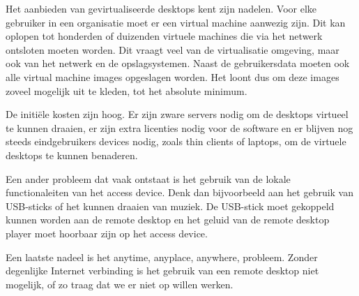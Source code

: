 Het aanbieden van gevirtualiseerde desktops kent zijn nadelen. Voor elke gebruiker in een organisatie moet er een virtual machine aanwezig zijn. Dit kan oplopen tot honderden of duizenden virtuele machines die via het netwerk ontsloten moeten worden. Dit vraagt veel van de virtualisatie omgeving, maar ook van het netwerk en de opslagsystemen. Naast de gebruikersdata moeten ook alle virtual machine images opgeslagen worden. Het loont dus om deze images zoveel mogelijk uit te kleden, tot het absolute minimum.

De initi\"ele kosten zijn hoog. Er zijn zware servers nodig om de desktops virtueel te kunnen draaien, er zijn extra licenties nodig voor de software en er blijven nog steeds eindgebruikers devices nodig, zoals thin clients of laptops, om de virtuele desktops te kunnen benaderen.

Een ander probleem dat vaak ontstaat is het gebruik van de lokale functionaleiten van het access device. Denk dan bijvoorbeeld aan het gebruik van USB-sticks of het kunnen draaien van muziek. De USB-stick moet gekoppeld kunnen worden aan de remote desktop en het geluid van de remote desktop player moet hoorbaar zijn op het access device.

Een laatste nadeel is het anytime, anyplace, anywhere, probleem. Zonder degenlijke Internet verbinding is het gebruik van een remote desktop niet mogelijk, of zo traag dat we er niet op willen werken.
